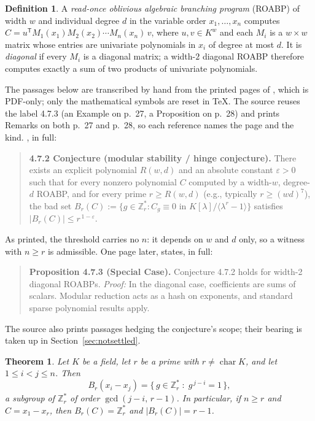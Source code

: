\documentclass[11pt]{amsart}
\newtheorem{theorem}{Theorem}
\theoremstyle{definition}
\newtheorem{definition}{Definition}
\theoremstyle{remark}
\newcommand{\KK}{K}
\newcommand{\Zrs}{\mathbb{Z}_r^{*}}
\newcommand{\Bad}{B_r}
\begin{document}
\begin{definition}\label{def:roabp}
A \emph{read-once oblivious algebraic branching program} (ROABP) of width $w$ and individual
degree $d$ in the variable order $x_1,\dots,x_n$ computes
$C=u^{\mathsf T}M_1(x_1)M_2(x_2)\cdots M_n(x_n)\,v$, where $u,v\in\KK^{w}$ and each $M_i$ is a
$w\times w$ matrix whose entries are univariate polynomials in $x_i$ of degree at most $d$. It is
\emph{diagonal} if every $M_i$ is a diagonal matrix; a width-$2$ diagonal ROABP therefore computes
exactly a sum of two products of univariate polynomials.
\end{definition}

\medskip
\noindent The passages below are transcribed by hand from the printed pages of \cite{SS}, which is
PDF-only; only the mathematical symbols are reset in \TeX. The source reuses the label 4.7.3 (an
Example on p.~27, a Proposition on p.~28) and prints Remarks on both p.~27 and p.~28, so each
reference names the page and the kind. \cite[Conjecture~4.7.2, printed pp.~26--27]{SS}, in full:

\begin{quote}
\textbf{4.7.2 Conjecture (modular stability / hinge conjecture).} There exists an explicit
polynomial $R(w,d)$ and an absolute constant $\varepsilon>0$ such that for every nonzero
polynomial $C$ computed by a width-$w$, degree-$d$ ROABP, and for every prime $r\ge R(w,d)$
(e.g., typically $r\ge (wd)^{7}$), the bad set
$\Bad(C):=\{g\in\Zrs : C_g\equiv 0 \text{ in } \KK[\lambda]/\langle\lambda^{r}-1\rangle\}$
satisfies $|\Bad(C)|\le r^{\,1-\varepsilon}$.
\end{quote}

\noindent As printed, the threshold carries no $n$: it depends on $w$ and $d$ only, so a witness
with $n\ge r$ is admissible. One page later,
\cite[Proposition~4.7.3, printed p.~28]{SS} states, in full:

\begin{quote}
\textbf{Proposition 4.7.3 (Special Case).} Conjecture 4.7.2 holds for width-2 diagonal ROABPs.
\emph{Proof:} In the diagonal case, coefficients are sums of scalars. Modular reduction acts as a
hash on exponents, and standard sparse polynomial results apply.
\end{quote}

\noindent The source also prints passages hedging the conjecture's scope; their bearing is taken up
in Section~\ref{sec:notsettled}.

\begin{theorem}\label{thm:main}
Let $\KK$ be a field, let $r$ be a prime with $r\ne\operatorname{char}\KK$, and let
$1\le i<j\le n$. Then
\[
 \Bad(x_i-x_j)=\bigl\{\,g\in\Zrs \;:\; g^{\,j-i}=1\,\bigr\},
\]
a subgroup of $\Zrs$ of order $\gcd(j-i,\,r-1)$. In particular, if $n\ge r$ and $C=x_1-x_r$, then
$\Bad(C)=\Zrs$ and $|\Bad(C)|=r-1$.
\end{theorem}
\end{document}
